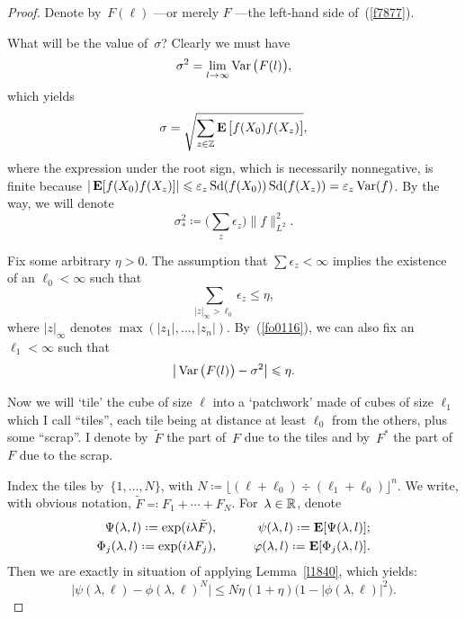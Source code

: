 \begin{proof}
Denote by~$F(\ell)$ —or merely $F$ —the left-hand side of~(\ref{f7877}).

What will be the value of~$\sigma$?
Clearly we must have
\[\label{fo0116} \sigma^2 = \lim_{\ell\longto\infty} \Var \big( F(\ell) \big) ,\]
which yields
\[ \sigma = \sqrt{ \sum_{z\in\ZZ} \EE\big[ f(X_0) f(X_z) \big] } ,\]
where the expression under the root sign,
which is necessarily nonnegative,
is finite because $|\mathop{\smash{\mathbf{E}}}\nolimits[f(X_0)f(X_z)]| \leqslant
\varepsilon_z \operatorname{Sd}(f(X_0))\operatorname{Sd}(f(X_z)) = \varepsilon_z \operatorname{Var}(f)$.
By the way, we will denote
\[ \sigma_*^2 \coloneqq \Big( \sum_z \epsilon_z \Big) \|f\|_{L^2}^2 .\]

Fix some arbitrary $\eta > 0$.
The assumption that $\sum \epsilon_z < \infty$
implies the existence of an $\ell_0 < \infty$
such that
\[ \sum_{|z|_\infty > \ell_0} \epsilon_z \leq \eta ,\]
where $|z|_\infty$ denotes $\max(|z_1|,\ldots,|z_n|)$.
By~(\ref{fo0116}), we can also fix an $\ell_1 < \infty$
such that
\[\label{f1939} \big| \Var \big( F(\ell) \big) - \sigma^2 \big| \leq \eta .\]

Now we will `tile' the cube of size $\ell$ into a `patchwork'
made of cubes of size $\ell_1$ which I call ``tiles'',
each tile being at distance at least $\ell_0$ from the others, plus some ``scrap''.
I denote by~$\tilde{F}$ the part of~$F$ due to the tiles
and by~$F^*$ the part of~$F$ due to the scrap.

Index the tiles by~$\{ 1,\ldots,N \}$, with
$N \coloneqq \big\lfloor (\ell+\ell_0) \div (\ell_1+\ell_0) \big\rfloor^n$.
We write, with obvious notation, $\tilde{F} \eqqcolon F_1 + \cdots + F_N$.
For~$\lambda\in\mathbb{R}$, denote
\begin{eqnarray}
\Psi (\lambda,\ell) \coloneqq \exp(i\lambda \tilde{F}), &\qquad&
\psi(\lambda,\ell) \coloneqq \EE[\Psi (\lambda,\ell)] ; \\
\Phi_j(\lambda,\ell) \coloneqq \exp(i\lambda F_j), &\qquad&
\phi(\lambda,\ell) \coloneqq \EE[\Phi_j(\lambda,\ell)] .
\end{eqnarray}
%
Then we are exactly in situation of applying Lemma~\ref{l1840},
which yields:
\[\label{f1890} \big| \psi(\lambda,\ell) - \phi(\lambda,\ell)^N \big| \leq
N \eta(1+\eta) \big( 1-|\phi(\lambda,\ell)|^2 \big) .\]


\end{proof}
